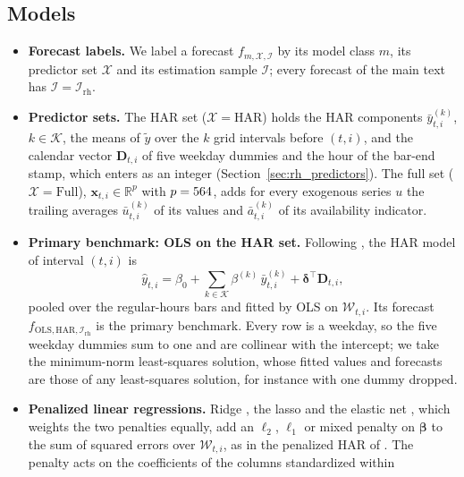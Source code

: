 \subsection{Models}
\label{sec:rh_methods_models}
\begin{itemize}
\item \textbf{Forecast labels.} We label a forecast $f_{m,\mathcal X,\mathcal I}$ by its model class $m$, its
  predictor set $\mathcal X$ and its estimation sample $\mathcal I$; every forecast of the main text has
  $\mathcal I = \mathcal I_{\mathrm{rh}}$.
\item \textbf{Predictor sets.} The HAR set ($\mathcal X = \mathrm{HAR}$) holds the HAR components
  $\bar y^{(k)}_{t,i}$, $k \in \mathcal K$, the means of $\tilde y$ over the $k$ grid intervals before $(t,i)$, and
  the calendar vector $\bm D_{t,i}$ of five weekday dummies and the hour of the bar-end stamp, which enters as an
  integer (Section~\ref{sec:rh_predictors}). The full set ($\mathcal X = \mathrm{Full}$),
  $\bm x_{t,i} \in \mathbb R^{p}$ with $p = 564$, adds for every exogenous series $u$ the trailing averages
  $\bar u^{(k)}_{t,i}$ of its values and $\bar a^{(k)}_{t,i}$ of its availability indicator.
\item \textbf{Primary benchmark: OLS on the HAR set.} Following \citet{Corsi2009}, the HAR model of interval $(t,i)$ is
  \[
    \hat y_{t,i} = \beta_0 + \sum_{k \in \mathcal K} \beta^{(k)}\, \bar y^{(k)}_{t,i} + \bm\delta^{\top} \bm D_{t,i} ,
  \]
  pooled over the regular-hours bars and fitted by OLS on $\mathcal W_{t,i}$. Its forecast
  $f_{\mathrm{OLS},\mathrm{HAR},\mathcal I_{\mathrm{rh}}}$ is the primary benchmark. Every row is a weekday, so the
  five weekday dummies sum to one and are collinear with the intercept; we take the minimum-norm least-squares
  solution, whose fitted values and forecasts are those of any least-squares solution, for instance with one dummy
  dropped.
\item \textbf{Penalized linear regressions.} Ridge \citep{HoerlKennard1970}, the lasso \citep{Tibshirani1996} and the
  elastic net \citep{ZouHastie2005}, which weights the two penalties equally, add an $\ell_2$, $\ell_1$ or mixed
  penalty on $\bm\beta$ to the sum of squared errors over $\mathcal W_{t,i}$, as in the penalized HAR of
  \citet{ZhangZhangCucuringuQian2024}. The penalty acts on the coefficients of the columns standardized within

\end{itemize}
